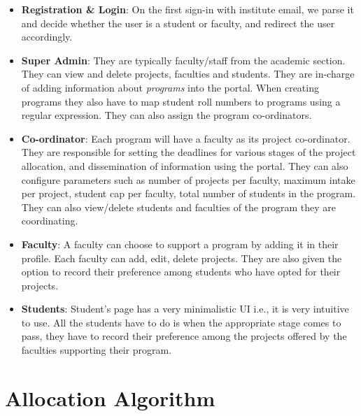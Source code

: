 \documentclass{article}
\begin{document}
\begin{itemize}
	\item \textbf{Registration \& Login}: On the first sign-in with institute email, we parse it and decide whether the user is a student or faculty, and redirect the user accordingly.

	\item \textbf{Super Admin}: They are typically faculty/staff from the academic section. They can view and delete projects, faculties and students. They are in-charge of adding information about \textit{programs} into the portal. When creating programs they also have to map student roll numbers to programs using a regular expression. They can also assign the program co-ordinators.

	\item \textbf{Co-ordinator}: Each program will have a faculty as its project co-ordinator. They are responsible for setting the deadlines for various stages of the project allocation, and dissemination of information using the portal. They can also configure parameters such as number of projects per faculty, maximum intake per project, student cap per faculty, total number of students in the program. They can also view/delete students and faculties of the program they are coordinating.

	\item \textbf{Faculty}: A faculty can choose to support a program by adding it in their profile. Each faculty can add, edit, delete projects. They are also given the option to record their preference among students who have opted for their projects.

	\item \textbf{Students}: Student's page has a very minimalistic UI i.e., it is very intuitive to use. All the students have to do is when the appropriate stage comes to pass, they have to record their preference among the projects offered by the faculties supporting their program.
\end{itemize}


\newpage
\section{Allocation Algorithm}
\end{document}
